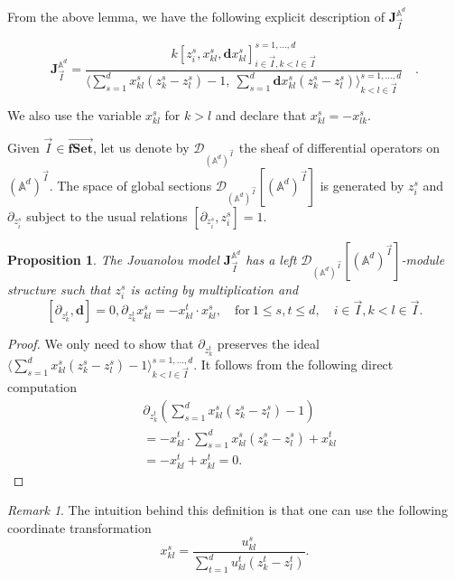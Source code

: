 \documentclass[11pt]{amsart}
\newtheorem{prop}[thm]{Proposition}
\theoremstyle{definition}
\theoremstyle{remark}
\newtheorem{rem}[thm]{Remark}
\numberwithin{equation}{section}
\begin{document}
From the above lemma, we have the following explicit description of $\mathbf{J}^{\mathbb{A}^d}_{\vec{I}}$

$$
\mathbf{J}^{\mathbb{A}^d}_{\vec{I}}=\frac{k[z^s_i,x^s_{kl},\mathbf{d}x^s_{kl}]^{s=1,\dots,d}_{i\in \vec{I},k<l\in \vec{I}}}{\langle \sum\limits_{s=1}^dx^s_{kl}(z^s_k-z^s_l)-1,\ \sum\limits_{s=1}^d\mathbf{d}x^s_{kl}(z^s_k-z^s_l) \rangle^{s=1,\dots,d}_{k<l\in \vec{I}}}\quad .
$$

We also use the variable $x^s_{kl}$ for $k>l$ and declare that $x^s_{kl}=-x^s_{lk}$.


Given $\vec{I}\in \overrightarrow{\mathbf{fSet}}$, let us denote by $\mathcal{D}_{(\mathbb{A}^d)^{\vec{I}}}$ the sheaf of differential operators on $(\mathbb{A}^d)^{\vec{I}}$. The space of global sections $\mathcal{D}_{(\mathbb{A}^d)^{\vec{I}}}[(\mathbb{A}^d)^{\vec{I}}]$ is generated by $z^s_{i}$ and $ \partial_{z^s_{i}}$ subject to the usual relations $[\partial_{z^s_{i}},z^s_{i}]=1$.

\begin{prop}
    The Jouanolou model $\mathbf{J}^{\mathbb{A}^d}_{\vec{I}}$ has a left $\mathcal{D}_{(\mathbb{A}^d)^{\vec{I}}}[(\mathbb{A}^d)^{\vec{I}}]$-module structure such that $z^s_i$ is acting by multiplication and
    $$
   [\partial_{z^t_k},\mathbf{d}]=0, \partial_{z^t_k}x^s_{kl}=-x^t_{kl}\cdot x^s_{kl}, \quad \text{for}\  1\leq s,t\leq d,\quad i\in \vec{I},k<l\in \vec{I}.
    $$

\end{prop}
\begin{proof}
We only need to show that $\partial_{z^t_k}$ preserves the ideal $\langle \sum\limits_{s=1}^dx^s_{kl}(z^s_k-z^s_l)-1\rangle^{s=1,\dots,d}_{k<l\in \vec{I}}$. It follows from the following direct computation
\begin{align*}
   & \partial_{z^t_k} \left(\sum\limits_{s=1}^dx^s_{kl}(z^s_k-z^s_l)-1\right)\\
   & =-x^t_{kl}\cdot\sum\limits_{s=1}^dx^s_{kl}(z^s_k-z^s_l)+x^t_{kl}\\
   &=-x^t_{kl}+x^t_{kl}=0.
\end{align*}

\end{proof}
\begin{rem}
    The intuition behind this definition is that one can use the following coordinate transformation
    $$
    x^s_{kl}=\frac{u^s_{kl}}{\sum\limits^d_{t=1}u^t_{kl}(z^t_k-z^t_l)}.
    $$
\end{rem}
\end{document}
